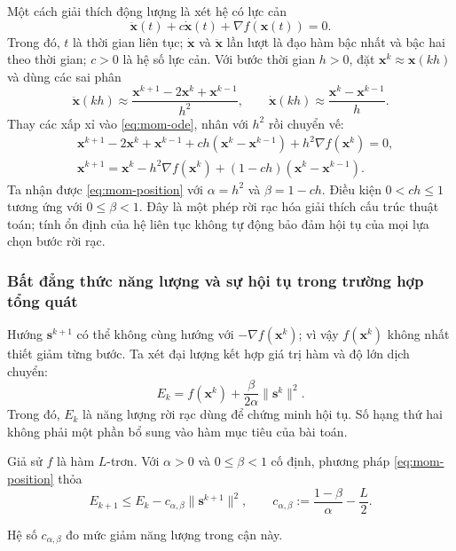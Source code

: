 Một cách giải thích động lượng là xét hệ có lực cản
\begin{equation}
 \ddot{\mathbf{x}}(t)+c\dot{\mathbf{x}}(t)
                        +\nabla f(\mathbf{x}(t))=0.
 \label{eq:mom-ode}
\end{equation}
Trong đó, $t$ là thời gian liên tục; $\dot{\mathbf{x}}$ và
$\ddot{\mathbf{x}}$ lần lượt là đạo hàm bậc nhất và bậc hai theo thời
gian; $c>0$ là hệ số lực cản. Với bước thời gian $h>0$, đặt
$\mathbf{x}^{k}\approx\mathbf{x}(kh)$ và dùng các sai phân
\[
 \ddot{\mathbf{x}}(kh)\approx
 \frac{\mathbf{x}^{k+1}-2\mathbf{x}^{k}+\mathbf{x}^{k-1}}{h^2},
 \qquad
 \dot{\mathbf{x}}(kh)\approx
 \frac{\mathbf{x}^{k}-\mathbf{x}^{k-1}}{h}.
\]
Thay các xấp xỉ vào \eqref{eq:mom-ode}, nhân với $h^2$ rồi chuyển vế:
\begin{align*}
 &\mathbf{x}^{k+1}-2\mathbf{x}^{k}+\mathbf{x}^{k-1}
 +ch(\mathbf{x}^{k}-\mathbf{x}^{k-1})
 +h^2\nabla f(\mathbf{x}^{k})=0,\\
 &\mathbf{x}^{k+1}=\mathbf{x}^{k}-h^2\nabla f(\mathbf{x}^{k})
 +(1-ch)(\mathbf{x}^{k}-\mathbf{x}^{k-1}).
\end{align*}
Ta nhận được \eqref{eq:mom-position} với $\alpha=h^2$ và $\beta=1-ch$.
Điều kiện $0<ch\leq1$ tương ứng với $0\leq\beta<1$.
Đây là một phép rời rạc hóa giải thích cấu trúc thuật toán; tính ổn định
của hệ liên tục không tự động bảo đảm hội tụ của mọi lựa chọn bước rời rạc.

\subsubsection{Bất đẳng thức năng lượng và sự hội tụ trong trường hợp tổng quát}

Hướng $\mathbf{s}^{k+1}$ có thể không cùng hướng với
$-\nabla f(\mathbf{x}^{k})$; vì vậy $f(\mathbf{x}^{k})$ không nhất thiết
giảm từng bước. Ta xét đại lượng kết hợp giá trị hàm và độ lớn dịch chuyển:
\begin{equation}
 E_k=f(\mathbf{x}^{k})+\frac{\beta}{2\alpha}\|\mathbf{s}^{k}\|^2.
 \label{eq:mom-energy}
\end{equation}
Trong đó, $E_k$ là năng lượng rời rạc dùng để chứng minh hội tụ.
Số hạng thứ hai không phải một phần bổ sung vào hàm mục tiêu của bài toán.

\begin{proposition}\label{prop:mom-energy}
Giả sử $f$ là hàm $L$-trơn. Với $\alpha>0$ và $0\leq\beta<1$ cố định,
phương pháp \eqref{eq:mom-position} thỏa
\begin{equation}
 E_{k+1}\leq E_k-c_{\alpha,\beta}\|\mathbf{s}^{k+1}\|^2,
 \qquad c_{\alpha,\beta}:=\frac{1-\beta}{\alpha}-\frac{L}{2}.
 \label{eq:mom-energy-descent}
\end{equation}
\end{proposition}
Hệ số $c_{\alpha,\beta}$ đo mức giảm năng lượng trong cận này.

